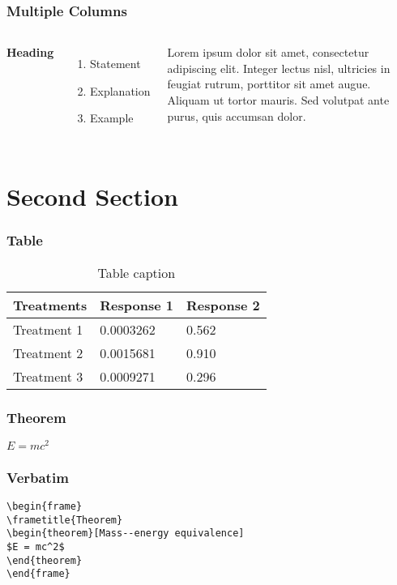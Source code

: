 \documentclass{beamer}
\begin{document}
\begin{frame}[fragile]
\frametitle{Multiple Columns}
\begin{columns}[c] %

\textbf{Heading}
\begin{enumerate}
\item Statement
\item Explanation
\item Example
\end{enumerate}

Lorem ipsum dolor sit amet, consectetur adipiscing elit. Integer lectus nisl, ultricies in feugiat rutrum, porttitor sit amet augue. Aliquam ut tortor mauris. Sed volutpat ante purus, quis accumsan dolor.

\end{columns}
\end{frame}

\section{Second Section}
\begin{frame}[fragile]
\frametitle{Table}
\begin{table}
\begin{tabular}{l l l}
\toprule
\textbf{Treatments} & \textbf{Response 1} & \textbf{Response 2}\\
\midrule
Treatment 1 & 0.0003262 & 0.562 \\
Treatment 2 & 0.0015681 & 0.910 \\
Treatment 3 & 0.0009271 & 0.296 \\
\bottomrule
\end{tabular}
\caption{Table caption}
\end{table}
\end{frame}

\begin{frame}[fragile]
\frametitle{Theorem}
\begin{theorem}
$E = mc^2$
\end{theorem}
\end{frame}

\begin{frame}[fragile] %
\frametitle{Verbatim}
\begin{example}
\begin{verbatim}
\begin{frame}
\frametitle{Theorem}
\begin{theorem}[Mass--energy equivalence]
$E = mc^2$
\end{theorem}
\end{frame}\end{verbatim}
\end{example}
\end{frame}
\end{document}
